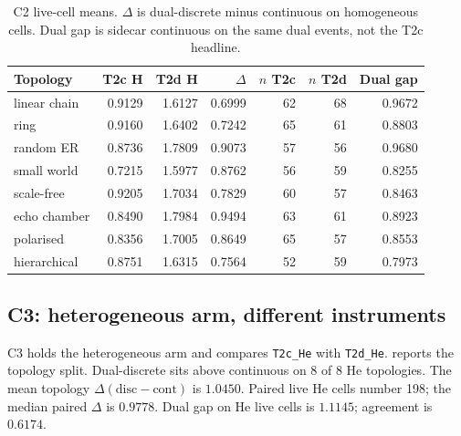\begin{table}[t]
\centering
\caption[C2 homo T2c versus T2d]{C2 live-cell means.
$\Delta$ is dual-discrete minus continuous on homogeneous cells.
Dual gap is sidecar continuous on the same dual events, not the T2c headline.}
\label{tab:c2}
\scriptsize
\begin{tabular}{lrrrrrr}
\toprule
Topology & T2c H & T2d H & $\Delta$ & $n$ T2c & $n$ T2d & Dual gap \\
\midrule
linear chain & 0.9129 & 1.6127 & 0.6999 & 62 & 68 & 0.9672 \\
ring & 0.9160 & 1.6402 & 0.7242 & 65 & 61 & 0.8803 \\
random ER & 0.8736 & 1.7809 & 0.9073 & 57 & 56 & 0.9680 \\
small world & 0.7215 & 1.5977 & 0.8762 & 56 & 59 & 0.8255 \\
scale-free & 0.9205 & 1.7034 & 0.7829 & 60 & 57 & 0.8463 \\
echo chamber & 0.8490 & 1.7984 & 0.9494 & 63 & 61 & 0.8923 \\
polarised & 0.8356 & 1.7005 & 0.8649 & 65 & 57 & 0.8553 \\
hierarchical & 0.8751 & 1.6315 & 0.7564 & 52 & 59 & 0.7973 \\
\bottomrule
\end{tabular}
\end{table}

\subsection{C3: heterogeneous arm, different instruments}

C3 holds the heterogeneous arm and compares \texttt{T2c\_He} with \texttt{T2d\_He}.
 reports the topology split.
Dual-discrete sits above continuous on 8 of 8 He topologies.
The mean topology $\Delta(\mathrm{disc}-\mathrm{cont})$ is $1.0450$.
Paired live He cells number 198; the median paired $\Delta$ is $0.9778$.
Dual gap on He live cells is $1.1145$; agreement is $0.6174$.

